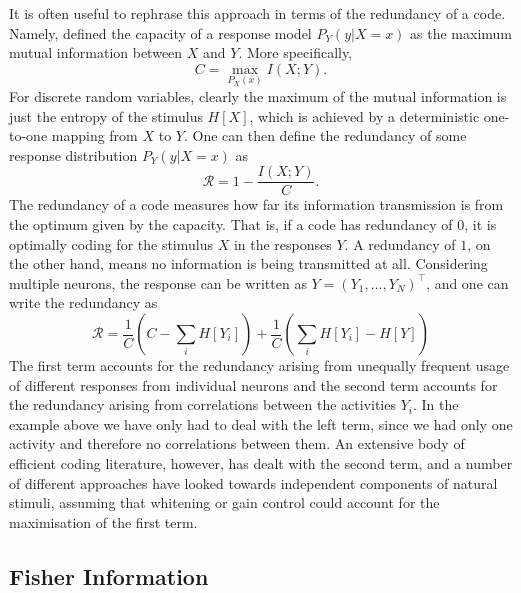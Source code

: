 It is often useful to rephrase this approach in terms of the redundancy of a code. Namely, defined the capacity of a response model $P_Y(y|X=x)$ as the maximum mutual information 
between $X$ and $Y$. More specifically,
\[
C = \max_{P_X(x)} I(X;Y).
\]
For discrete random variables, clearly the maximum of the mutual information is just the entropy of the stimulus $H[X]$, which is achieved by a deterministic
one-to-one mapping from $X$ to $Y$. One can then define the redundancy of some
response distribution $P_Y(y|X=x)$ as
\[
\mathcal{R} = 1 - \frac{I(X;Y)}{C}.
\]
The redundancy of a code measures how far its information transmission is from the optimum given by the capacity. That is, if a code has redundancy of $0$, it is optimally coding for the
stimulus $X$ in the responses $Y$. A redundancy of $1$, on the other hand, means no information is being transmitted at all. Considering multiple neurons, the response
can be written as $Y = (Y_1,\ldots,Y_N)^\top$, and one can write the redundancy as
\[
\mathcal{R} =\frac{1}{C} \left(C - \sum_i H[Y_i] \right) + \frac{1}{C}\left(\sum_i H[Y_i] -H[Y]\right)
\]
The first term accounts for the redundancy arising from unequally frequent usage of different responses from individual neurons and the second term accounts for the 
redundancy arising from 
correlations between the activities $Y_i$. In the example above we have only had to deal with the left term, since we had only one activity and therefore no 
correlations between them. An extensive body of efficient coding literature, however, has dealt with the second term, and a number of different approaches have looked 
towards independent components of natural stimuli, assuming that whitening or gain control could account for the maximisation of the first term.\par

\subsection{Fisher Information}

